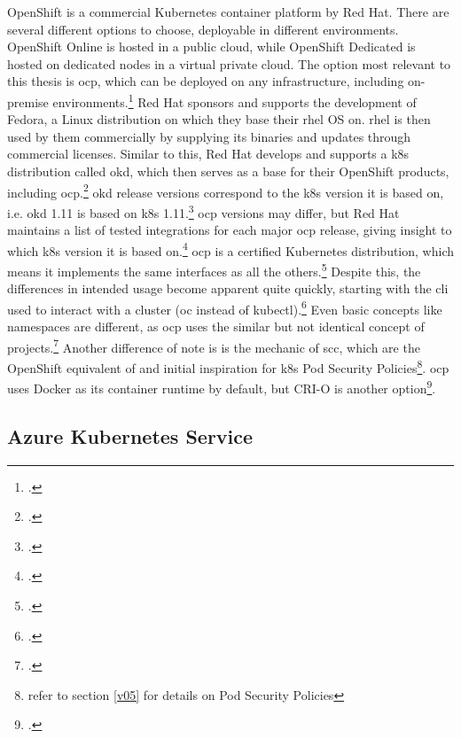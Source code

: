 OpenShift is a commercial Kubernetes container platform by Red Hat. There are several different options to choose, deployable in different environments. OpenShift Online is hosted in a public cloud, while OpenShift Dedicated is hosted on dedicated nodes in a virtual private cloud. The option most relevant to this thesis is \gls{ocp}, which can be deployed on any infrastructure, including on-premise environments.\footcite[][, section 'OpenShift plans and pricing']{openShiftOptions}
Red Hat sponsors and supports the development of Fedora, a Linux distribution on which they base their \gls{rhel} OS on. \gls{rhel} is then used by them commercially by supplying its binaries and updates through commercial licenses.
Similar to this, Red Hat develops and supports a \gls{k8s} distribution called \gls{okd}, which then serves as a base for their OpenShift products, including \gls{ocp}.\footcite[][, section 'OKD vs Red Hat OpenShift']{ocpVsOkd}
\gls{okd} release versions correspond to the \gls{k8s} version it is based on, i.e. \gls{okd} 1.11 is based on \gls{k8s} 1.11.\footcite[][, section 'What is OKD?']{okd}
\gls{ocp} versions may differ, but Red Hat maintains a list of tested integrations for each major \gls{ocp} release, giving insight to which \gls{k8s} version it is based on.\footcite[][, table 'Platform Components']{ocpK8sVersions}
\gls{ocp} is a certified Kubernetes distribution, which means it implements the same interfaces as all the others.\footcite[][, table 'Platform - Certified Kubernetes - Distribution']{certifiedK8s}
Despite this, the differences in intended usage become apparent quite quickly, starting with the \gls{cli} used to interact with a cluster (oc instead of kubectl).\footcite[][, section 'Basic Setup and Login']{ocpCli}
Even basic concepts like namespaces are different, as \gls{ocp} uses the similar but not identical concept of projects.\footcite[][, section 'Overview']{ocpProjects}
Another difference of note is is the mechanic of \gls{scc}, which are the OpenShift equivalent of and initial inspiration for \gls{k8s} Pod Security Policies\footnote{refer to section \ref{v05} for details on Pod Security Policies}.
\gls{ocp} uses Docker as its container runtime by default, but CRI-O is another option\footcite[][, section 'Getting CRI-O']{ocpCrio}.

\subsection{Azure Kubernetes Service}

